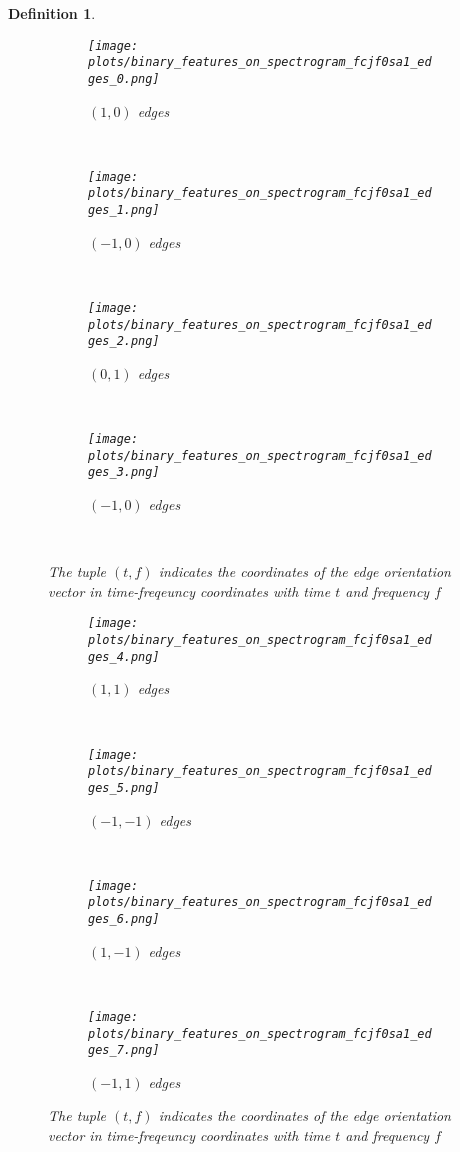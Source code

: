 \documentclass[english]{article}
\newtheorem{defn}{Definition}[section]
\begin{document}
\begin{defn}
\begin{figure}
\label{fig:spectrogram-overlayed-edges}
\centering
\begin{subfigure}
    \centering
    \texttt{[image: plots/binary\_features\_on\_spectrogram\_fcjf0sa1\_edges\_0.png]}
    \caption{$(1,0)$ edges}
    \label{fig:overlayed_edges-0}
    \end{subfigure} 
~
\begin{subfigure}
    \centering
    \texttt{[image: plots/binary\_features\_on\_spectrogram\_fcjf0sa1\_edges\_1.png]}
    \caption{$(-1,0)$ edges}
    \label{fig:overlayed_edges-1}
    \end{subfigure} 
~
\begin{subfigure}
    \centering
    \texttt{[image: plots/binary\_features\_on\_spectrogram\_fcjf0sa1\_edges\_2.png]}
    \caption{$(0,1)$ edges}
    \label{fig:overlayed_edges-2}
    \end{subfigure} 
~
\begin{subfigure}
    \centering
    \texttt{[image: plots/binary\_features\_on\_spectrogram\_fcjf0sa1\_edges\_3.png]}
    \caption{$(-1,0)$ edges}
    \label{fig:overlayed_edges-3}
    \end{subfigure} 
~
    \caption{The tuple $(t,f)$ indicates the coordinates of the edge
orientation vector in time-freqeuncy coordinates with time $t$ and frequency $f$}
\end{figure}

\begin{figure}
\centering
\begin{subfigure}
    \centering
    \texttt{[image: plots/binary\_features\_on\_spectrogram\_fcjf0sa1\_edges\_4.png]}
    \caption{$(1,1)$ edges}
    \label{fig:overlayed_edges-4}
    \end{subfigure} 
~
\begin{subfigure}
    \centering
    \texttt{[image: plots/binary\_features\_on\_spectrogram\_fcjf0sa1\_edges\_5.png]}
    \caption{$(-1,-1)$ edges}
    \label{fig:overlayed_edges-5}
    \end{subfigure} 
~
\begin{subfigure}
    \centering
    \texttt{[image: plots/binary\_features\_on\_spectrogram\_fcjf0sa1\_edges\_6.png]}
    \caption{$(1,-1)$ edges}
    \label{fig:overlayed_edges-6}
    \end{subfigure} 
~
\begin{subfigure}
    \centering
    \texttt{[image: plots/binary\_features\_on\_spectrogram\_fcjf0sa1\_edges\_7.png]}
    \caption{$(-1,1)$ edges}
    \label{fig:overlayed_edges-7}
    \end{subfigure} 
\caption{The tuple $(t,f)$ indicates the coordinates of the edge
orientation vector in time-freqeuncy coordinates with time $t$ and frequency $f$}
\end{figure}


\end{defn}
\end{document}
